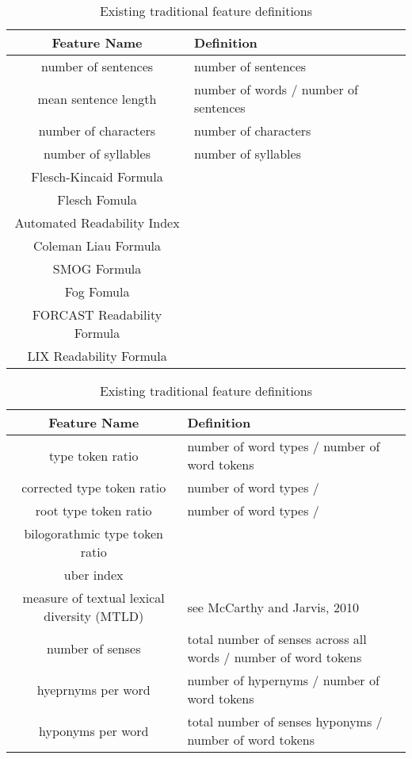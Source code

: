 \documentclass[11pt,a4paper]{article}
\theoremstyle{definition}
\begin{document}
\begin{table}
\centering
\begin{tabular}{|c|p{11cm}|}
\hline
\textbf{Feature Name} & \textbf{Definition} \\\hline
number of sentences & number of sentences \\\hline
mean sentence length & number of words / number of sentences \\\hline
number of characters & number of characters \\\hline
number of syllables & number of syllables \\\hline
Flesch-Kincaid Formula &  \\\hline
Flesch Fomula &  \\\hline
Automated Readability Index &  \\\hline
Coleman Liau Formula &  \\\hline
SMOG Formula &  \\\hline
Fog Fomula &  \\\hline
FORCAST Readability Formula &  \\\hline
LIX Readability Formula &  \\\hline
\end{tabular}
\caption{Existing traditional feature definitions}
\end{table}

\begin{table}
\centering
\begin{tabular}{|c|p{9.7cm}|}
\hline
\textbf{Feature Name} & \textbf{Definition} \\\hline
type token ratio & number of word types / number of word tokens \\\hline
corrected type token ratio & number of word types /  \\\hline
root type token ratio & number of word types /  \\\hline
bilogorathmic type token ratio &  \\\hline
uber index &  \\\hline
measure of textual lexical diversity (MTLD) & see McCarthy and Jarvis, 2010 \\\hline
number of senses & total number of senses across all words / number of word tokens \\\hline
hyeprnyms per word & number of hypernyms / number of word tokens \\\hline
hyponyms per word & total number of senses hyponyms / number of word tokens \\\hline
\end{tabular}
\caption{Existing traditional feature definitions}
\end{table} \clearpage
{}
\end{document}
